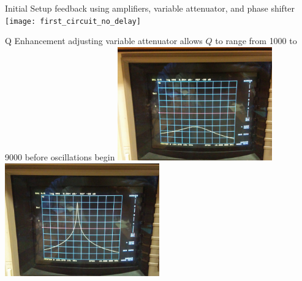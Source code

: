 \documentclass{beamer}
\begin{document}
\begin{frame}{Initial Setup}
{\tiny feedback using amplifiers, variable attenuator, and phase shifter}
\texttt{[image: first\_circuit\_no\_delay]}
\end{frame}

\begin{frame}{Q Enhancement}
{\tiny adjusting variable attenuator allows $Q$ to range from 1000 to 9000 before oscillations begin}
\includegraphics[width=0.5\textwidth]{low_q}
\includegraphics[width=0.5\textwidth]{high_q}
\end{frame}


\end{document}
